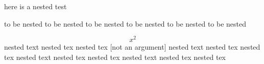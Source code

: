 here is a nested test
\begin{one}
	to be nested to be nested
	to be nested to be nested
	to be nested to be nested
	\begin{two}
		\[ x^2\]
		nested text nested tex nested tex [not an argument]
		nested text nested tex nested tex
		nested text nested tex nested tex
		nested text nested tex nested tex
	\end{two}
\end{one}
